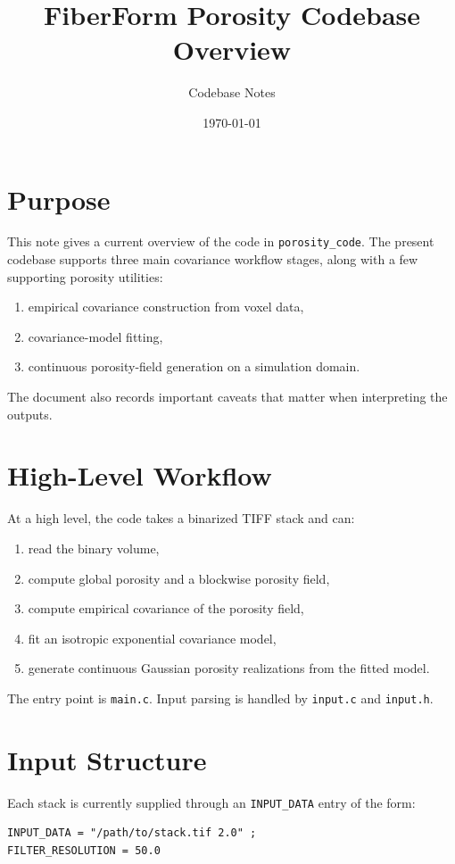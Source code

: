 \documentclass[11pt]{article}
\title{FiberForm Porosity Codebase Overview}
\author{Codebase Notes}
\date{\today}
\begin{document}
\maketitle

\section{Purpose}
This note gives a current overview of the code in
\texttt{porosity\_code}. The present codebase supports three main covariance
workflow stages, along with a few supporting porosity utilities:
\begin{enumerate}[label=\arabic*.]
\item empirical covariance construction from voxel data,
\item covariance-model fitting,
\item continuous porosity-field generation on a simulation domain.
\end{enumerate}

The document also records important caveats that matter when interpreting the
outputs.

\section{High-Level Workflow}
At a high level, the code takes a binarized TIFF stack and can:
\begin{enumerate}[label=\arabic*.]
\item read the binary volume,
\item compute global porosity and a blockwise porosity field,
\item compute empirical covariance of the porosity field,
\item fit an isotropic exponential covariance model,
\item generate continuous Gaussian porosity realizations from the fitted model.
\end{enumerate}

The entry point is \texttt{main.c}. Input parsing is handled by
\texttt{input.c} and \texttt{input.h}.

\section{Input Structure}
Each stack is currently supplied through an \texttt{INPUT\_DATA} entry of the
form:
\begin{verbatim}
INPUT_DATA = "/path/to/stack.tif 2.0" ;
FILTER_RESOLUTION = 50.0
\end{verbatim}
\end{document}
